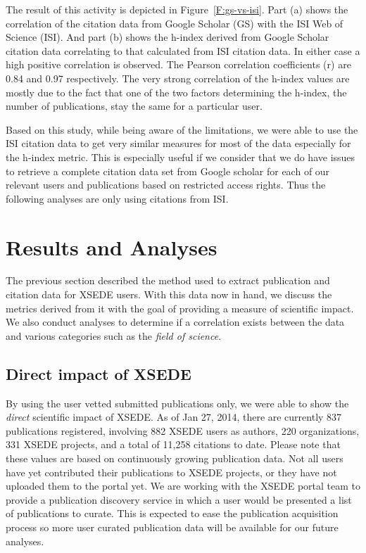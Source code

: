 \documentclass{sig-alternate}
\begin{document}
The result of this activity is depicted in Figure~\ref{F:gs-vs-isi}. Part (a) shows the correlation of the citation data from Google Scholar (GS) with the ISI Web of Science (ISI). And part (b) shows the h-index derived from Google Scholar citation data correlating to that calculated from ISI citation data. In either case a high positive correlation is observed. The Pearson correlation coefficients (r) are 0.84 and 0.97 respectively. The very strong correlation of the h-index values are mostly due to the fact that one of the two factors determining the h-index, the number of publications, stay the same for a particular user.

Based on this study, while being aware of the limitations, we were able to use the ISI citation data to get very similar measures for most of the data especially for the h-index metric. This is especially useful if we consider that we do have issues to retrieve a complete citation data set from Google scholar for each of our relevant users and publications based on restricted access rights. Thus the following analyses are only using citations from ISI.


\section{Results and Analyses} \label{S:result}

The previous section described the method used to extract publication and citation data for XSEDE users.  With this data now in hand, we discuss the metrics derived from it with the goal of providing a measure of scientific impact. We also conduct analyses to determine if a correlation exists between the data and various categories such as the {\em field of science}.
 
\subsection{Direct impact of XSEDE} 
 
By using the user vetted submitted publications only, we were able to show the \emph{direct} scientific impact of XSEDE.  As of Jan 27, 2014, there are currently 837 publications registered, involving 882 XSEDE users as authors, 220 organizations, 331 XSEDE projects, and a total of 11,258 citations to date. Please note that these values are based on continuously growing publication data. Not all users have yet contributed their publications to XSEDE projects, or they have not uploaded them to the portal yet. We are working with the XSEDE portal team to provide a publication discovery service in which a user would be presented a list of publications to curate. This is expected to ease the publication acquisition process so more user curated publication data will be available for our future analyses.
\end{document}
